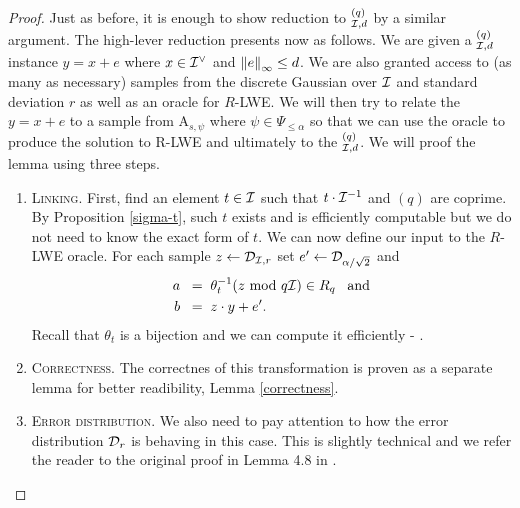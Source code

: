 \begin{proof}
	Just as before, it is enough to show reduction to $^{(q)}_{\mathcal{I},d}$ by a similar argument. The high-lever reduction presents now as follows. We are given a $_{\mathcal{I}, d}^{(q)}$ instance $y = x + e$ where $x \in \mathcal{I}^{\vee}$ and $\norm{e}_{\infty} \leq d$. We are also granted access to (as many as necessary) samples from the discrete Gaussian over $\mathcal{I}$ and standard deviation $r$ as well as an oracle for $R$-LWE. We will then try to relate the $y = x + e$ to a sample from A$_{s, \psi}$ where $\psi \in \Psi_{\leq \alpha}$ so that we can use the oracle to produce the solution to R-LWE and ultimately to the $^{(q)}_{\mathcal{I},d}$. We will proof the lemma using three steps.

	\begin{enumerate}
		\item \textsc{Linking.} First, find an element $t \in \mathcal{I}$ such that $t \cdot \mathcal{I}^{-1}$ and $(q)$ are coprime. By Proposition \ref{sigma-t}, such $t$ exists and is efficiently computable but we do not need to know the exact form of $t$. We can now define our input to the $R$-LWE oracle. For each sample $z \leftarrow \mathcal{D}_{\mathcal{I}, r}$ set $e' \leftarrow \mathcal{D}_{\alpha/\sqrt{2}}$ and 
			\begin{align*}
				a \; \; = & \; \; \theta_t^{-1}(z \text{ mod } q\mathcal{I}) \in R_q \; \; \;\text{and} \\
				b \; \; = & \; \; z \cdot y + e'.
			\end{align*}
			Recall that $\theta_t$ is a bijection and we can compute it efficiently - \cite{toolkit}.
		\item \textsc{Correctness.} The correctnes of this transformation is proven as a separate lemma for better readibility, Lemma \ref{correctness}.
		\item \textsc{Error distribution.} We also need to pay attention to how the error distribution $\mathcal{D}_r$ is behaving in this case. This is slightly technical and we refer the reader to the original proof in Lemma 4.8 in \cite{ring-lwe}.
	\end{enumerate}
\end{proof}


